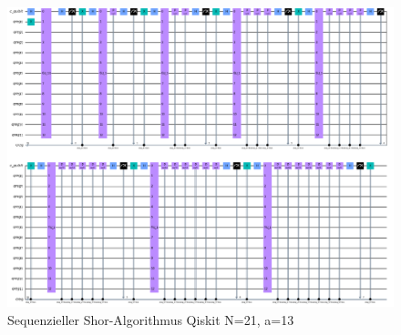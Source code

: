 \documentclass[a4paper,journal]{IEEEtran}
\begin{document}
\begin{figure}[p]
\centering
\caption{Sequenzieller Shor-Algorithmus Qiskit N=21, a=13}
\label{fig:QiskitN1a13}
\includegraphics[height=\linewidth,angle=90]{qiskit_Shor_21_a13.PNG}
\end{figure}
\end{document}
